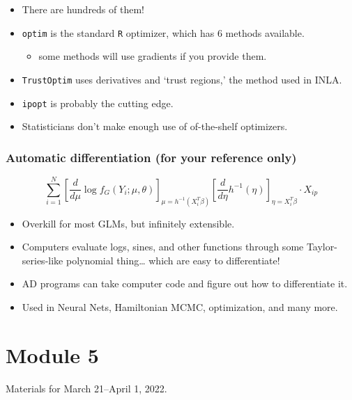 \documentclass[
  openany]{book}
\providecommand{\tightlist}{%
  \setlength{\itemsep}{0pt}\setlength{\parskip}{0pt}}
\newenvironment{yellowbox}{
  \definecolor{shadecolor}{rgb}{254,187,67}  %
  \color{black}
  \begin{shaded}}
 {\end{shaded}}
\begin{document}
\begin{itemize}
\item
  There are hundreds of them!
\item
  \texttt{optim} is the standard \texttt{R} optimizer, which has 6 methods
  available.

  \begin{itemize}
  \tightlist
  \item
    some methods will use gradients if you provide them.
  \end{itemize}
\item
  \texttt{TrustOptim} uses derivatives and `trust regions,' the method used
  in INLA.
\item
  \texttt{ipopt} is probably the cutting edge.
\item
  Statisticians don't make enough use of of-the-shelf optimizers.
\end{itemize}

\hypertarget{automatic-differentiation-for-your-reference-only}{%
\subsection{Automatic differentiation (for your reference only)}\label{automatic-differentiation-for-your-reference-only}}

\[\sum_{i=1}^N \left[\frac{d}{d \mu} \log f_G (Y_i; \mu, \theta)
\right]_{\mu = h^{-1}(X_i^T\beta)} 
\left[ 
\frac{d}{d \eta}h^{-1}(\eta)
\right]_{\eta = X_i^T\beta} \cdot X_{ip}\]

\begin{itemize}
\tightlist
\item
  Overkill for most GLMs, but infinitely extensible.
\item
  Computers evaluate logs, sines, and other functions through some
  Taylor-series-like polynomial thing\ldots{} which are easy to differentiate!
\item
  AD programs can take computer code and figure out how to
  differentiate it.
\item
  Used in Neural Nets, Hamiltonian MCMC, optimization, and many more.
\end{itemize}

\hypertarget{m5}{%
\chapter{Module 5}\label{m5}}

\begin{yellowbox}
Materials for March 21--April 1, 2022.

\end{yellowbox}
\end{document}
